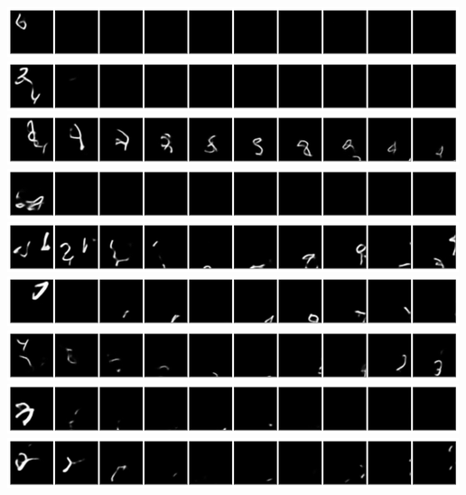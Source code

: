 \newpage
\begin{center}
    \includegraphics[width=\linewidth]{figures/SQAIR/vrnn_samples/000002.png}
    \includegraphics[width=\linewidth]{figures/SQAIR/vrnn_samples/000004.png}
    \includegraphics[width=\linewidth]{figures/SQAIR/vrnn_samples/000007.png}
    \includegraphics[width=\linewidth]{figures/SQAIR/vrnn_samples/000009.png}
    \includegraphics[width=\linewidth]{figures/SQAIR/vrnn_samples/000012.png}
    \includegraphics[width=\linewidth]{figures/SQAIR/vrnn_samples/000013.png}
    \includegraphics[width=\linewidth]{figures/SQAIR/vrnn_samples/000016.png}
    \includegraphics[width=\linewidth]{figures/SQAIR/vrnn_samples/000066.png}
    \includegraphics[width=\linewidth]{figures/SQAIR/vrnn_samples/000084.png}
    \label{fig:mnist_samples_vrnn}
\end{center}

